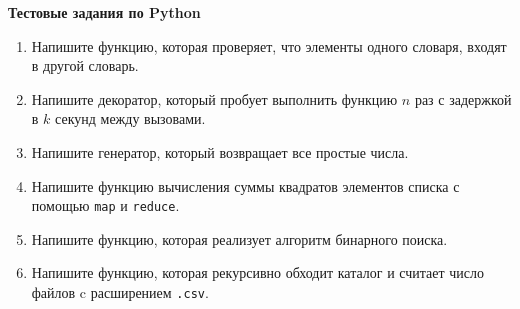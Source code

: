 \documentclass[14pt]{extarticle}
\begin{document}
\begin{center}\bf
Тестовые задания по Python
\end{center}

\begin{enumerate}
    \item Напишите функцию, которая проверяет, что элементы одного словаря, входят в другой словарь.
    
    \item Напишите декоратор, который пробует выполнить функцию $n$ раз с задержкой в $k$ секунд между вызовами.

    \item Напишите генератор, который возвращает все простые числа.

    \item Напишите функцию вычисления суммы квадратов элементов списка с помощью {\tt map} и {\tt reduce}.

    \item Напишите функцию, которая реализует алгоритм бинарного поиска.

    \item Напишите функцию, которая рекурсивно обходит каталог и считает число файлов c расширением {\tt .csv}.

\end{enumerate}
\end{document}
